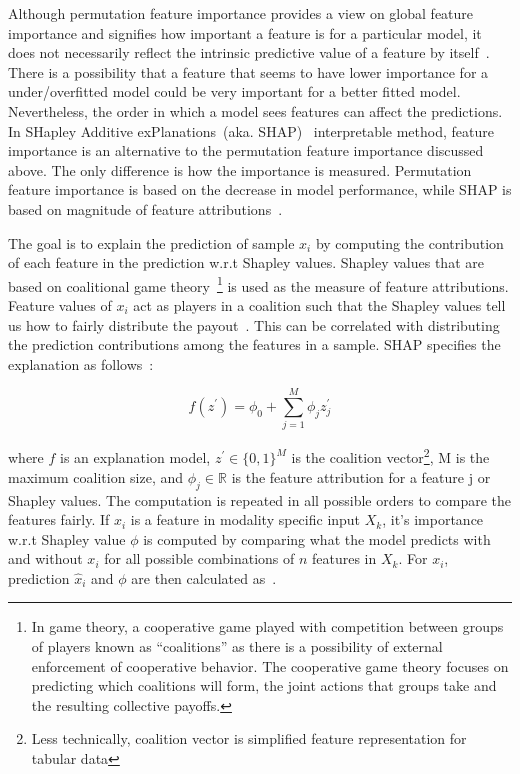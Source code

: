 \hspace*{3.5mm} Although permutation feature importance provides a view on global feature importance and signifies how important a feature is for a particular model, it does not necessarily reflect the intrinsic predictive value of a feature by itself~\cite{molnar2019interpretable}. There is a possibility that a feature that seems to have lower importance for a under/overfitted model could be very important for a better fitted model. Nevertheless, the order in which a model sees features can affect the predictions. In SHapley Additive exPlanations~(aka. SHAP)~\cite{SHAP} interpretable method, feature importance is an alternative to the permutation feature importance discussed above. The only difference is how the importance is measured. Permutation feature importance is based on the decrease in model performance, while SHAP is based on magnitude of feature attributions~\cite{molnar2019interpretable}. 

\hspace*{3.5mm} The goal is to explain the prediction of sample $x_i$ by computing the contribution of each feature in the prediction w.r.t Shapley values. Shapley values that are based on coalitional game theory~\cite{branzei2008models}\footnote{In game theory, a cooperative game played with competition between groups of players known as ``coalitions'' as there is a possibility of external enforcement of cooperative behavior. The cooperative game theory focuses on predicting which coalitions will form, the joint actions that groups take and the resulting collective payoffs.} is used as the measure of feature attributions. Feature values of $x_i$ act as players in a coalition such that the Shapley values tell us how to fairly distribute the  payout~\cite{molnar2019interpretable}. This can be correlated with distributing the prediction contributions among the features in a sample. SHAP specifies the explanation as follows~\cite{molnar2019interpretable}:

\begin{equation}
    f\left(z^{\prime}\right)=\phi_{0}+\sum_{j=1}^{M} \phi_{j} z_{j}^{\prime}
\end{equation}

\hspace*{3.5mm} where $f$ is an explanation model, $z^{\prime} \in\{0,1\}^{M}$ is the coalition vector\footnote{Less technically, coalition vector is simplified feature representation for tabular data}, $\mathrm{M}$ is the maximum coalition size, and $\phi_{j} \in \mathbb{R}$ is the feature attribution for a feature $\mathrm{j}$ or Shapley values. The computation is repeated in all possible orders to compare the features fairly. If $x_i$ is a feature in modality specific input $X_k$, it's importance w.r.t Shapley value $\phi$ is computed by comparing what the model predicts with and without $x_i$ for all possible combinations of $n$ features in $X_k$. For $x_i$, prediction $\hat x_i$ and $\phi$ are then calculated as~\cite{NIPS2017_7062}. 

